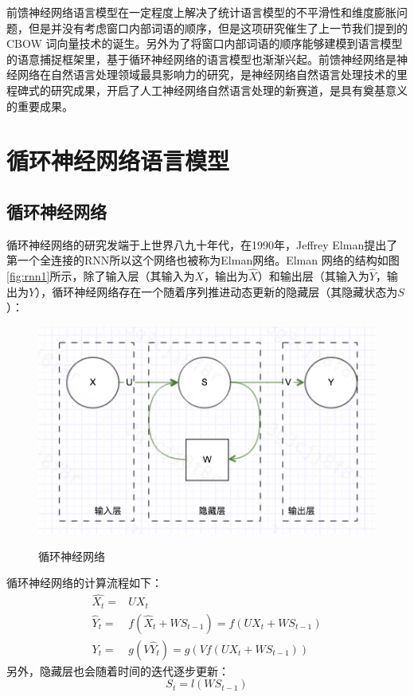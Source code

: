 \documentclass[twoside,a4paper,12pt]{book}%
\begin{document}
前馈神经网络语言模型在一定程度上解决了统计语言模型的不平滑性和维度膨胀问题，但是并没有考虑窗口内部词语的顺序，但是这项研究催生了上一节我们提到的\gls{CBOW} 词向量技术的诞生。另外为了将窗口内部词语的顺序能够建模到语言模型的语意捕捉框架里，基于循环神经网络的语言模型也渐渐兴起。前馈神经网络是神经网络在自然语言处理领域最具影响力的研究，是神经网络自然语言处理技术的里程碑式的研究成果，开启了人工神经网络自然语言处理的新赛道，是具有奠基意义的重要成果。

\section{循环神经网络语言模型}
\subsection{循环神经网络}
循环神经网络的研究发端于上世界八九十年代，在1990年，Jeffrey Elman提出了第一个全连接的\gls{RNN}所以这个网络也被称为Elman网络。Elman 网络的结构如图\ref{fig:rnn1}所示，除了输入层（其输入为$X$，输出为$\hat X$）和输出层（其输入为$\hat Y$，输出为$Y$），循环神经网络存在一个随着序列推进动态更新的隐藏层（其隐藏状态为$S$）：

\begin{figure}[htbp]
\begin{center}
\includegraphics[width=5.0in]{figures/rnn1.png}
\caption{循环神经网络}\label{fig:rnn1}
\label{default}
\end{center}
\label{rnn1}
\end{figure}

循环神经网络的计算流程如下：
$$
\begin{aligned}
\hat{X_t} =& UX_t \\
\hat Y_t =& f(\hat X_t + WS_{t-1}) = f(UX_t + WS_{t-1}) \\
Y_t=&g(V\hat Y_t) =g(Vf(UX_t + WS_{t-1})) 
\end{aligned}
$$
另外，隐藏层也会随着时间的迭代逐步更新：
$$S_t = l(WS_{t-1})$$
\end{document}
